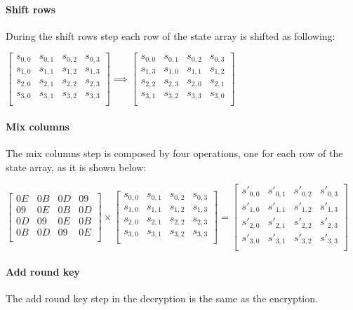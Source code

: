 \paragraph{Shift rows}
During the shift rows step each row of the state array is shifted as following:\\
\begin{center}
	$
	\begin{bmatrix}
	s_{0,0} & s_{0,1} & s_{0,2} & s_{0,3} \\ 
	s_{1,0} & s_{1,1} & s_{1,2} & s_{1,3} \\
	s_{2,0} & s_{2,1} & s_{2,2} & s_{2,3} \\
	s_{3,0} & s_{3,1} & s_{3,2} & s_{3,3} \\
	\end{bmatrix}
	\implies
	\begin{bmatrix}
	s_{0,0} & s_{0,1} & s_{0,2} & s_{0,3} \\ 
	s_{1,3} & s_{1,0} & s_{1,1} & s_{1,2}\\
	s_{2,2} & s_{2,3} & s_{2,0} & s_{2,1} \\
	s_{3,1} & s_{3,2} & s_{3,3} & s_{3,0} \\
	\end{bmatrix}
	$
\end{center}
\paragraph{Mix columns}


The mix columns step is composed by four operations, one for each row of the state array, as it is shown below:

$
\begin{bmatrix}
0E & 0B & 0D & 09 \\ 
09 & 0E & 0B & 0D \\
0D & 09 & 0E & 0B \\
0B & 0D & 09 & 0E \\
\end{bmatrix}
\times
\begin{bmatrix}
s_{0,0} & s_{0,1} & s_{0,2} & s_{0,3} \\ 
s_{1,0} & s_{1,1} & s_{1,2} & s_{1,3} \\
s_{2,0} & s_{2,1} & s_{2,2} & s_{2,3} \\
s_{3,0} & s_{3,1} & s_{3,2} & s_{3,3} \\
\end{bmatrix}
=
\begin{bmatrix}
s'_{0,0} & s'_{0,1} & s'_{0,2} & s'_{0,3} \\ 
s'_{1,0} & s'_{1,1} & s'_{1,2} & s'_{1,3} \\
s'_{2,0} & s'_{2,1} & s'_{2,2} & s'_{2,3} \\
s'_{3,0} & s'_{3,1} & s'_{3,2} & s'_{3,3} \\
\end{bmatrix}
$

\paragraph{Add round key}
The add round key step in the decryption is the same as the encryption.


